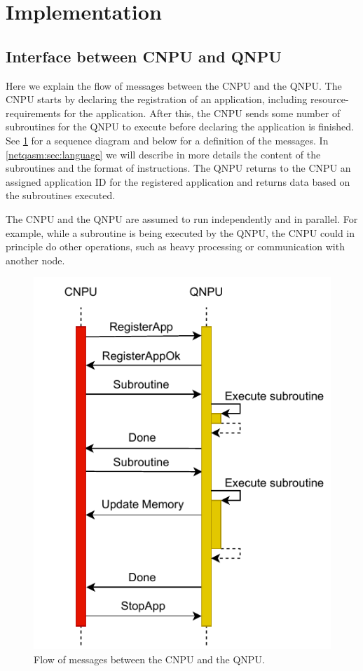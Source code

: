 \section{Implementation}
\label{netqasm:sec:implementation}

\subsection{Interface between \ac{CNPU} and \ac{QNPU}}
Here we explain the flow of messages between the \ac{CNPU} and the \ac{QNPU}.
The \ac{CNPU} starts by declaring the registration of an application, including resource-requirements for the application.
After this, the \ac{CNPU} sends some number of subroutines for the \ac{QNPU} to execute before declaring the application is finished.
See \cref{netqasm:fig:message_sequence} for a sequence diagram and below for a definition of the messages.
In \cref{netqasm:sec:language} we will describe in more details the content of the subroutines and the format of instructions.
The \ac{QNPU} returns to the \ac{CNPU} an assigned application ID for the registered application and returns data based on the subroutines executed.

The \ac{CNPU} and the \ac{QNPU} are assumed to run independently and in parallel.
For example, while a subroutine is being executed by the \ac{QNPU}, the \ac{CNPU} could in principle do other operations, such as heavy processing or communication with another node.

\begin{figure}
      \centering
      \includegraphics[width=0.5\linewidth]{figures/netqasm/message-flow.pdf}
      \caption{Flow of messages between the \ac{CNPU} and the \ac{QNPU}.}
      \label{netqasm:fig:message_sequence}
\end{figure}

